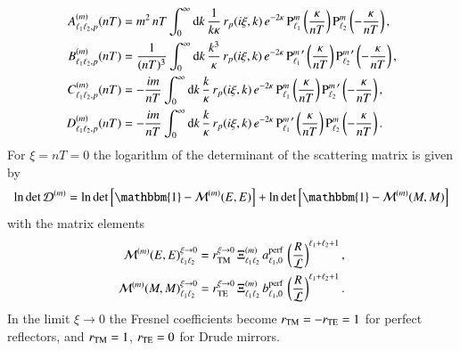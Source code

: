 \begin{align}
A_{\ell_1 \ell_2,p}^{(m)}(nT) &= m^2 \, nT \int_0^\infty \mathrm{d}k \, \frac{1}{k \kappa} \, r_p(i\xi,k) \, e^{-2\kappa} \, {\text{P}_{\ell_1}^{m}}\left(\frac{\kappa}{nT}\right) {\text{P}_{\ell_2}^{m}}\left(-\frac{\kappa}{nT}\right), \\
B_{\ell_1 \ell_2,p}^{(m)}(nT) &= \frac{1}{(nT)^3} \int_0^\infty \mathrm{d}k \, \frac{k^3}{\kappa} \, r_p(i\xi,k) \, e^{-2\kappa} \, {\text{P}_{\ell_1}^{m}}^\prime\left(\frac{\kappa}{nT}\right) {\text{P}_{\ell_2}^{m}}^\prime\left(-\frac{\kappa}{nT}\right), \\
C_{\ell_1 \ell_2,p}^{(m)}(nT) &= -\frac{i m}{nT} \int_0^\infty \mathrm{d}k \, \frac{k}{\kappa} \, r_p(i\xi,k) \, e^{-2\kappa} \, {\text{P}_{\ell_1}^{m}}\left(\frac{\kappa}{nT}\right) {\text{P}_{\ell_2}^{m}}^\prime\left(-\frac{\kappa}{nT}\right), \\
D_{\ell_1 \ell_2,p}^{(m)}(nT) &= -\frac{i m}{nT} \int_0^\infty \mathrm{d}k \, \frac{k}{\kappa} \, r_p(i\xi,k) \, e^{-2\kappa} \, {\text{P}_{\ell_1}^{m}}^\prime\left(\frac{\kappa}{nT}\right) {\text{P}_{\ell_2}^{m}}\left(-\frac{\kappa}{nT}\right).
\end{align}
For $\xi=nT=0$ the logarithm of the determinant of the scattering matrix is given by
\begin{equation}
\log\det\mathcal{D}^{(m)} = \log\det\left[\mathbbm{1} - \mathcal{M}^{(m)}(E,E)\right] + \log\det\left[\mathbbm{1} - \mathcal{M}^{(m)}(M,M)\right]
\end{equation}
with the matrix elements
\begin{align}
\label{eq:scattering_ps_conclusion_xi0_EE}
\mathcal{M}^{(m)}(E,E)_{\ell_1 \ell_2}^{\xi\to 0} &= r_{\mathrm{TM}}^{\xi\to0} \, \Xi_{\ell_1 \ell_2}^{(m)} \, a_{\ell_1,0}^\text{perf} \, \left(\frac{R}{\mathcal{L}}\right)^{\ell_1+\ell_2+1}, \\
\label{eq:scattering_ps_conclusion_xi0_MM}
\mathcal{M}^{(m)}(M,M)_{\ell_1 \ell_2}^{\xi\to 0} &= r_{\mathrm{TE}}^{\xi\to0} \, \Xi_{\ell_1 \ell_2}^{(m)} \, b_{\ell_1,0}^\text{perf} \, \left(\frac{R}{\mathcal{L}}\right)^{\ell_1+\ell_2+1}.
\end{align}
In the limit $\xi\to0$ the Fresnel coefficients become $r_{\mathrm{TM}}=-r_{\mathrm{TE}}=1$ for
perfect reflectors, and $r_{\mathrm{TM}}=1$, $r_{\mathrm{TE}}=0$ for Drude mirrors.
